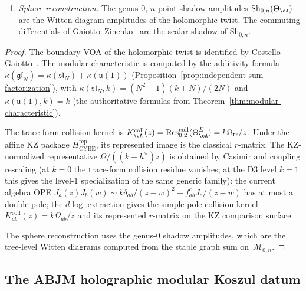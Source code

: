 \begin{theorem}
\begin{enumerate}[label=\textup{(\roman*)}]
\item \emph{Sphere reconstruction.}
 The genus-$0$, $n$-point shadow amplitudes
 $\mathrm{Sh}_{0,n}(\Theta_\cA)$ are the Witten
 diagram amplitudes of the holomorphic twist. The
 commuting differentials of Gaiotto--Zinenko~\cite{GZ26}
 are the scalar shadow of $\mathrm{Sh}_{0,n}$.
\end{enumerate}
\end{theorem}

\begin{proof}
The boundary VOA of the holomorphic twist is identified
by Costello--Gaiotto~\cite{Costello-Gaiotto18}.
The modular characteristic is computed by the additivity
formula
$\kappa(\mathfrak{gl}_N) =
\kappa(\mathfrak{sl}_N) + \kappa(\mathfrak{u}(1))$
(Proposition~\ref{prop:independent-sum-factorization}),
with $\kappa(\mathfrak{sl}_N, k)
= (N^2{-}1)(k{+}N)/(2N)$ and
$\kappa(\mathfrak{u}(1), k) = k$
(the authoritative formulas from
Theorem~\ref{thm:modular-characteristic}).

The trace-form collision kernel is
$K_\cA^{\mathrm{coll}}(z)
=\mathrm{Res}^{\mathrm{coll}}_{0,2}(\Theta_\cA^{E_1})
=k\Omega_{\mathrm{tr}}/z$.  Under the affine KZ package
$H_{\mathrm{CYBE}}^{\mathrm{rep}}$, its represented image is the
classical $r$-matrix. The KZ-normalized representative
$\Omega/((k+h^\vee)z)$ is obtained by Casimir and coupling rescaling
\textup{(}at $k=0$ the trace-form collision residue vanishes; at the
D3 level $k=1$ this gives the level-$1$ specialization of the same
generic family\textup{)}:
the current algebra OPE
$J_a(z)J_b(w) \sim k\delta_{ab}/(z{-}w)^2 +
f^c_{ab}J_c/(z{-}w)$
has at most a double pole; the $d\log$ extraction
 gives the simple-pole collision kernel
 $K_{ab}^{\mathrm{coll}}(z)=k\Omega_{ab}/z$ and its represented
 $r$-matrix on the KZ comparison surface.

The sphere reconstruction uses the genus-$0$ shadow
amplitudes, which are the tree-level Witten diagrams
computed from the stable graph sum on~$\overline{\mathcal{M}}_{0,n}$.
\end{proof}

%
%

\subsection{The ABJM holographic modular Koszul datum}
\label{subsec:frontier-abjm}

